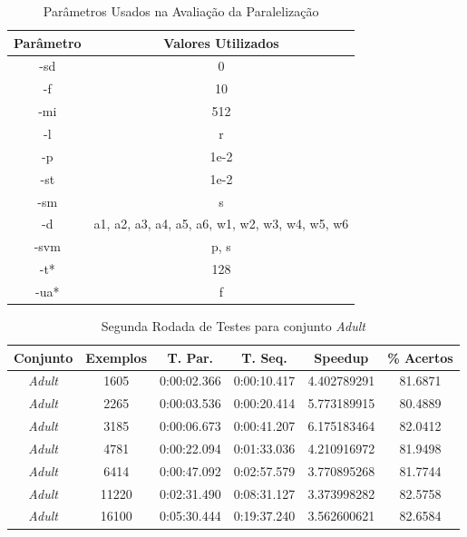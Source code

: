 \begin{table}
    \caption{Parâmetros Usados na Avaliação da Paralelização}
    \label{tab:testParameters2}
    \centering
    \begin{tabular}{|c|c|} \hline
        Parâmetro & Valores Utilizados \\ \hline
        -sd & 0 \\ \hline
        -f & 10 \\ \hline
        -mi & 512 \\ \hline
        -l & r \\ \hline
        -p & 1e-2 \\ \hline
        -st & 1e-2 \\ \hline
        -sm & s \\ \hline
        -d & a1, a2, a3, a4, a5, a6, w1, w2, w3, w4, w5, w6\\ \hline
        -svm & p, s\\ \hline
        -t* & 128 \\ \hline
        -ua* & f \\ \hline
    \end{tabular}
\end{table}

\begin{table}
    \caption{Segunda Rodada de Testes para conjunto \emph{Adult}}
    \label{tab:bestResults2a}
    \small
    \centering
    \begin{tabular}{|c|c|c|c|c|c|} \hline
		Conjunto & Exemplos & T. Par. & T. Seq. & Speedup & \% Acertos\\ \hline
		\em{Adult} & 1605 & 0:00:02.366 & 0:00:10.417 & 4.402789291 & 81.6871\\ \hline
		\em{Adult} & 2265 & 0:00:03.536 & 0:00:20.414 & 5.773189915 & 80.4889\\ \hline
		\em{Adult} & 3185 & 0:00:06.673 & 0:00:41.207 & 6.175183464 & 82.0412\\ \hline
		\em{Adult} & 4781 & 0:00:22.094 & 0:01:33.036 & 4.210916972 & 81.9498\\ \hline
		\em{Adult} & 6414 & 0:00:47.092 & 0:02:57.579 & 3.770895268 & 81.7744\\ \hline
		\em{Adult} & 11220 & 0:02:31.490 & 0:08:31.127 & 3.373998282 & 82.5758\\ \hline
		\em{Adult} & 16100 & 0:05:30.444 & 0:19:37.240 & 3.562600621 & 82.6584\\ \hline
    \end{tabular}
\end{table}

